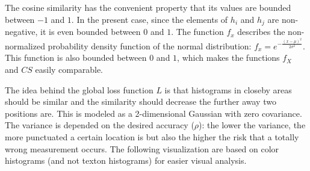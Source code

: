The cosine similarity has the convenient property that its values are bounded between $-1$ and $1$. In the present case, since the elements of $h_i$ and $h_j$ are non-negative, it is even bounded between $0$ and $1$. The function $f_x$ describes the non-normalized probability density function of the normal distribution: $f_x = e^{- \frac{(x - \mu)^2}{2 \sigma ^ 2}}$. This function is also bounded between $0$ and $1$, which makes the functions $f_X$ and $CS$ easily comparable.

The idea behind the global loss function $L$ is that histograms in closeby areas
should be similar and the similarity should decrease the further away
two positions are. This is modeled as a 2-dimensional Gaussian with zero
covariance. The variance is depended on the
desired accuracy ($\rho$): the lower the variance, the more punctuated
a certain location is but also the higher the risk that a totally
wrong measurement occurs. The following visualization are based on
color histograms (and not texton histograms) for easier visual
analysis.